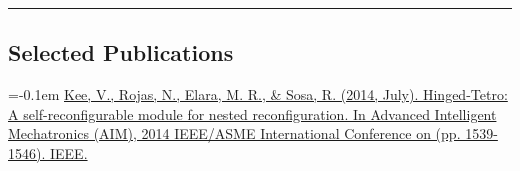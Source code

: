 \documentclass[10pt,letterpaper]{article}
\begin{document}
\hrule
\vspace{-0.6em}

\subsection*{Selected Publications}
    \parskip=-0.1em
{\href{http://ieeexplore.ieee.org/xpls/abs_all.jsp?arnumber=6878302}{Kee, V., Rojas, N., Elara, M. R., \& Sosa, R. (2014, July). Hinged-Tetro: A self-reconfigurable module for nested reconfiguration. In Advanced Intelligent Mechatronics (AIM), 2014 IEEE/ASME International Conference on (pp. 1539-1546). IEEE.}}
\end{document}
